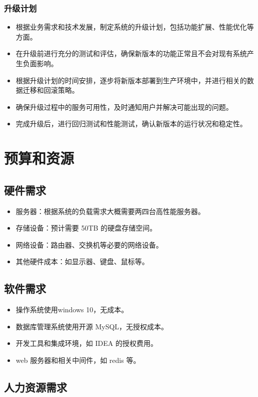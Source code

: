 \documentclass{article}
\begin{document}
\subsubsection{升级计划}
\begin{itemize}
	\item 根据业务需求和技术发展，制定系统的升级计划，包括功能扩展、性能优化等方面。
	\item 在升级前进行充分的测试和评估，确保新版本的功能正常且不会对现有系统产生负面影响。
	\item 根据升级计划的时间安排，逐步将新版本部署到生产环境中，并进行相关的数据迁移和回滚策略。
	\item 确保升级过程中的服务可用性，及时通知用户并解决可能出现的问题。
	\item 完成升级后，进行回归测试和性能测试，确认新版本的运行状况和稳定性。
\end{itemize}

\section{预算和资源}
\subsection{硬件需求}
\begin{itemize}
	\item 服务器：根据系统的负载需求大概需要两四台高性能服务器。
	\item 存储设备：预计需要 50TB 的硬盘存储空间。
	\item 网络设备：路由器、交换机等必要的网络设备。
	\item 其他硬件成本：如显示器、键盘、鼠标等。
\end{itemize}

\subsection{软件需求}
\begin{itemize}
	\item 操作系统使用windows 10，无成本。
	\item 数据库管理系统使用开源 MySQL，无授权成本。
	\item 开发工具和集成环境，如 IDEA 的授权费用。
	\item web 服务器和相关中间件，如 redis 等。
\end{itemize}

\subsection{人力资源需求}
\end{document}
